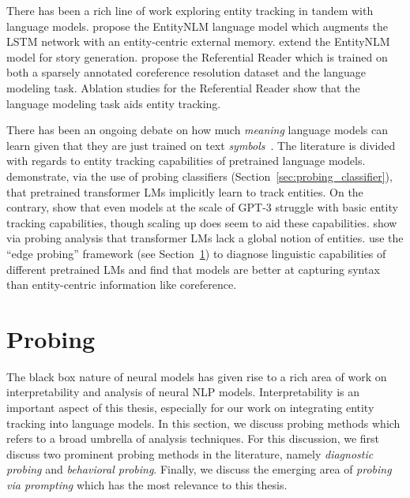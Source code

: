 \documentclass[12pt]{thesis-umich}[thesis]
\begin{document}
There has been a rich line of work exploring entity tracking in tandem with language models. \citet{ji-etal-2017-dynamic} propose the EntityNLM language model which augments the LSTM network with an entity-centric external memory. \citet{clark-etal-2018-neural} extend the EntityNLM model for story generation. 
\citet{liu2019referential} propose the Referential Reader which is trained on both a sparsely annotated coreference resolution dataset and the language modeling task. Ablation studies for the Referential Reader show that the language modeling task aids entity tracking. 

There has been an ongoing debate on how much \emph{meaning} language models can learn given that they are just trained on text \emph{symbols}~\cite{bender-koller-2020-climbing, Bender2021OnTD}. The literature is divided with regards to entity tracking capabilities of pretrained language models.
\citet{li-etal-2021-implicit} demonstrate, via the use of probing classifiers (Section~\ref{sec:probing_classifier}), that pretrained transformer LMs implicitly learn to track entities. 
On the contrary, \citet{schuster-linzen-2022-sentence} show that even models at the scale of GPT-3 struggle with basic entity tracking capabilities, though scaling up does seem to aid these capabilities.
\citet{sorodoc-etal-2020-probing} show via probing analysis that transformer LMs lack a global notion of entities. \citet{tenney2019probing} use the ``edge probing'' framework (see Section~\ref{sec:probing_intro}) to diagnose linguistic capabilities of different pretrained LMs and find that models are better at capturing syntax than entity-centric information like coreference. 


 
\section{Probing}
\label{sec:probing_intro}
The black box nature of neural models has given rise to a rich area of work on interpretability and analysis of neural NLP models. 
Interpretability is an important aspect of this thesis, especially for our work on integrating entity tracking into language models.
In this section, we discuss probing methods which refers to a broad umbrella of analysis techniques. 
For this discussion, we first discuss two prominent probing methods in the literature, namely \emph{diagnostic probing} and \emph{behavioral probing}. Finally, we discuss the emerging area of \emph{probing via prompting} which has the most relevance to this thesis.  
\end{document}
